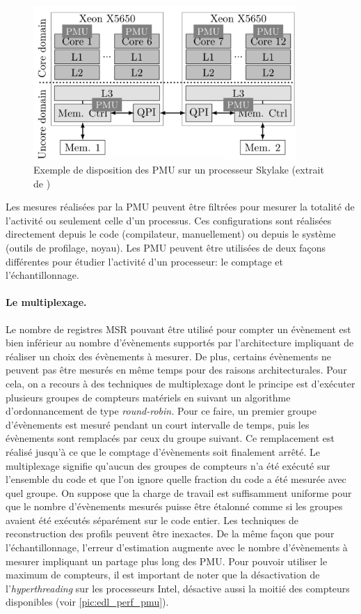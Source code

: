         \begin{figure}[h!]
        \center
        \includegraphics[width=10cm]{images/yamb_skl_pmu.png}
        \caption{\label{pic:yamb_skl_pmu}Exemple de disposition des PMU sur un processeur Skylake (extrait de \cite{Selva2017})}
        \end{figure}
        
        Les mesures réalisées par la PMU peuvent être filtrées pour mesurer la totalité de l'activité ou seulement celle d'un processus. Ces configurations sont réalisées  directement depuis le code (compilateur, manuellement) ou depuis le système (outils de profilage, noyau). Les PMU peuvent être utilisées de deux façons différentes pour étudier l'activité d'un processeur: le comptage et l'échantillonnage. 

        \paragraph{Le multiplexage.}
        
            Le nombre de registres MSR pouvant être utilisé pour compter un évènement est bien inférieur au nombre d'évènements supportés par l'architecture impliquant de réaliser un choix des évènements à mesurer. De plus, certains évènements ne peuvent pas être mesurés en même temps pour des raisons architecturales. 
            Pour cela, on a recours à des techniques de multiplexage dont le principe est d'exécuter plusieurs groupes de compteurs matériels en suivant un algorithme d'ordonnancement de type \textit{round-robin.} Pour ce faire, un premier groupe d'évènements est mesuré pendant un court intervalle de temps, puis les évènements sont remplacés par ceux du groupe suivant. Ce remplacement est réalisé jusqu'à ce que le comptage d'évènements soit finalement arrêté. Le multiplexage signifie qu'aucun des groupes de compteurs n'a été exécuté sur l'ensemble du code et que l'on ignore quelle fraction du code a été mesurée avec quel groupe. On suppose que la charge de travail est suffisamment uniforme pour que le nombre d'évènements mesurés puisse être étalonné comme si les groupes avaient été exécutés séparément sur le code entier. 
            Les techniques de reconstruction des profils peuvent être inexactes\cite{Lim}. De la même façon que pour l'échantillonnage, l'erreur d'estimation augmente avec le nombre d'évènements à mesurer impliquant un partage plus long des PMU. Pour pouvoir utiliser le maximum de compteurs, il est important de noter que la désactivation de l'\textit{hyperthreading} sur les processeurs Intel, désactive aussi la moitié des compteurs disponibles (voir \autoref{pic:edl_perf_pmu}).


